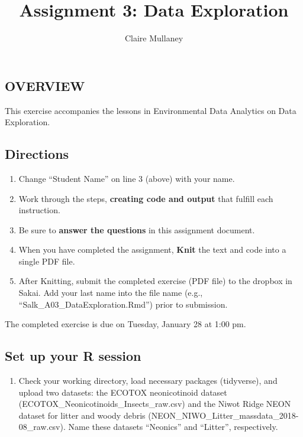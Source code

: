 \documentclass[]{article}
\title{Assignment 3: Data Exploration}
\author{Claire Mullaney}
\date{}
\providecommand{\tightlist}{%
  \setlength{\itemsep}{0pt}\setlength{\parskip}{0pt}}
\begin{document}
\maketitle

\hypertarget{overview}{%
\subsection{OVERVIEW}\label{overview}}

This exercise accompanies the lessons in Environmental Data Analytics on
Data Exploration.

\hypertarget{directions}{%
\subsection{Directions}\label{directions}}

\begin{enumerate}
\def\labelenumi{\arabic{enumi}.}
\tightlist
\item
  Change ``Student Name'' on line 3 (above) with your name.
\item
  Work through the steps, \textbf{creating code and output} that fulfill
  each instruction.
\item
  Be sure to \textbf{answer the questions} in this assignment document.
\item
  When you have completed the assignment, \textbf{Knit} the text and
  code into a single PDF file.
\item
  After Knitting, submit the completed exercise (PDF file) to the
  dropbox in Sakai. Add your last name into the file name (e.g.,
  ``Salk\_A03\_DataExploration.Rmd'') prior to submission.
\end{enumerate}

The completed exercise is due on Tuesday, January 28 at 1:00 pm.

\hypertarget{set-up-your-r-session}{%
\subsection{Set up your R session}\label{set-up-your-r-session}}

\begin{enumerate}
\def\labelenumi{\arabic{enumi}.}
\tightlist
\item
  Check your working directory, load necessary packages (tidyverse), and
  upload two datasets: the ECOTOX neonicotinoid dataset
  (ECOTOX\_Neonicotinoids\_Insects\_raw.csv) and the Niwot Ridge NEON
  dataset for litter and woody debris
  (NEON\_NIWO\_Litter\_massdata\_2018-08\_raw.csv). Name these datasets
  ``Neonics'' and ``Litter'', respectively.
\end{enumerate}
\end{document}
